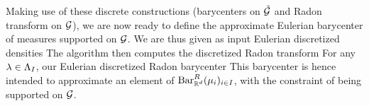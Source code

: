 Making use of these discrete constructions (barycenters on ${\tilde {\mathcal{G}}}$ and Radon transform on $\mathcal{G}$), we are now ready to define the approximate Eulerian barycenter of measures supported on $\mathcal{G}$. 
We are thus given as input Eulerian discretized densities
The algorithm then computes the discretized Radon transform 
For any $\lambda \in \Lambda_I$, our Eulerian discretized Radon barycenter
This barycenter is hence intended to approximate an element of $\text{\upshape Bar}_{\mathbb{R}^d}^R(\mu_i)_{i \in I}$, with the constraint of being supported on $\mathcal{G}$. 


